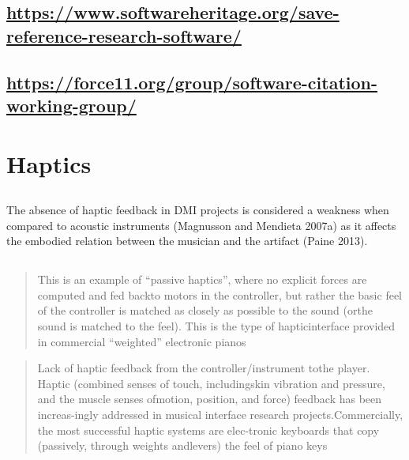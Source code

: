 \subsection{\cite{smith_software_2016}}

\subsection{\url{https://www.softwareheritage.org/save-reference-research-software/}}
\subsection{\url{https://force11.org/group/software-citation-working-group/}}



\section{Haptics}


\subsection{\cite{calegario_designing_2019}}


\begin{quotation}
    
\end{quotation}
The absence of haptic feedback in DMI projects is considered a weakness when
compared to acoustic instruments (Magnusson and Mendieta 2007a) as it affects
the embodied relation between the musician and the artifact (Paine 2013).


\subsection{\cite{cook_remutualizing_2004}}

\begin{quotation}
    This is an example of “passive haptics”, where no explicit forces are
    computed and fed backto motors in the controller, but rather the basic feel
    of the controller is matched as closely as possible to the sound (orthe
    sound is matched to the feel). This is the type of hapticinterface provided
    in commercial “weighted” electronic pianos
\end{quotation}


\begin{quotation}
    Lack of haptic feedback from the controller/instrument tothe player. Haptic
    (combined senses of touch, includingskin vibration and pressure, and the
    muscle senses ofmotion, position, and force) feedback has been increas-ingly
    addressed in musical interface research projects.Commercially, the most
    successful haptic systems are elec-tronic keyboards that copy (passively,
    through weights andlevers) the feel of piano keys
\end{quotation}

